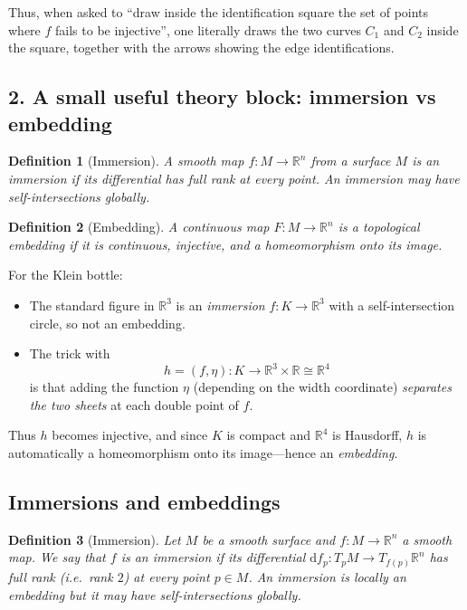 \documentclass[12pt,a4paper]{article}
\theoremstyle{plain}
\newtheorem{definition}{Definition}
\theoremstyle{definition}      %
\begin{document}
Thus, when asked to “draw inside the identification square the set of points where $f$ fails to be injective”, one literally draws the two curves $C_1$ and $C_2$ inside the square, together with the arrows showing the edge identifications.

\bigskip

\subsection*{2. A small useful theory block: immersion vs embedding}

\begin{definition}[Immersion]
	A smooth map $f : M \to \mathbb{R}^n$ from a surface $M$ is an \emph{immersion}
	if its differential has full rank at every point.  
	An immersion may have self-intersections globally.
\end{definition}

\begin{definition}[Embedding]
	A continuous map $F : M \to \mathbb{R}^n$ is a \emph{topological embedding}
	if it is continuous, injective, and a homeomorphism onto its image.
\end{definition}

For the Klein bottle:

\begin{itemize}
	\item The standard figure in $\mathbb{R}^3$ is an \emph{immersion} 
	$f : K \to \mathbb{R}^3$ with a self-intersection circle, so not an embedding.
	\item The trick with 
	\[
	h = (f,\eta) : K \to \mathbb{R}^3\times\mathbb{R}\cong\mathbb{R}^4
	\]
	is that adding the function $\eta$ (depending on the width coordinate) 
	\emph{separates the two sheets} at each double point of $f$.
\end{itemize}

Thus $h$ becomes injective, and since $K$ is compact and $\mathbb{R}^4$ is Hausdorff,
$h$ is automatically a homeomorphism onto its image—hence an \emph{embedding}.


\subsection*{Immersions and embeddings}

\begin{definition}[Immersion]
	Let $M$ be a smooth surface and $f : M \to \mathbb{R}^n$ a smooth map.
	We say that $f$ is an \emph{immersion} if its differential
	$\mathrm{d}f_p : T_pM \to T_{f(p)}\mathbb{R}^n$ has full rank
	(i.e.\ rank $2$) at every point $p\in M$.  An immersion is locally
	an embedding but it may have self-intersections globally.
\end{definition}
\end{document}
